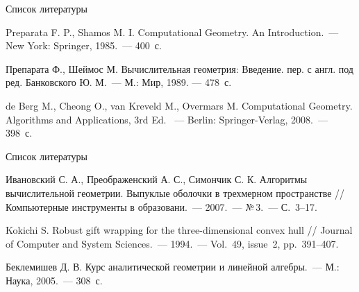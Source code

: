 \documentclass[]{beamer} %
\begin{document}
\begin{frame}{Список литературы}
    \begin{thebibliography}{9}
         Preparata F. P., Shamos M. I. Computational Geometry. An Introduction.~--- New York: Springer, 1985.~--- 400~с.

         Препарата Ф., Шеймос М. Вычислительная геометрия: Введение. пер. с англ. под ред. Банковского Ю. М.~--- М.: Мир, 1989. --- 478~с.

         de Berg M., Cheong O., van Kreveld M., Overmars M. Computational Geometry. Algorithms and Applications, 3rd Ed. ~--- Berlin: Springer-Verlag, 2008.~--- 398~с.
        \end{thebibliography}
\end{frame}

\begin{frame}{Список литературы}
    \begin{thebibliography}{9}
         Ивановский С. А., Преображенский А. С., Симончик С. К. Алгоритмы вычислительной геометрии. Выпуклые оболочки в трехмерном пространстве // Компьютерные инструменты в образовани.~--- 2007.~--- №\,3.~--- С.~3--17.

         Kokichi S. Robust gift wrapping for the three-dimensional convex hull // Journal of Computer and System Sciences.~--- 1994.~--- Vol.~49, issue~2, pp.~391--407.

         Беклемишев Д. В. Курс аналитической геометрии и линейной алгебры.~--- М.: Наука, 2005.~--- 308~с.
        \end{thebibliography}
\end{frame}
\end{document}
